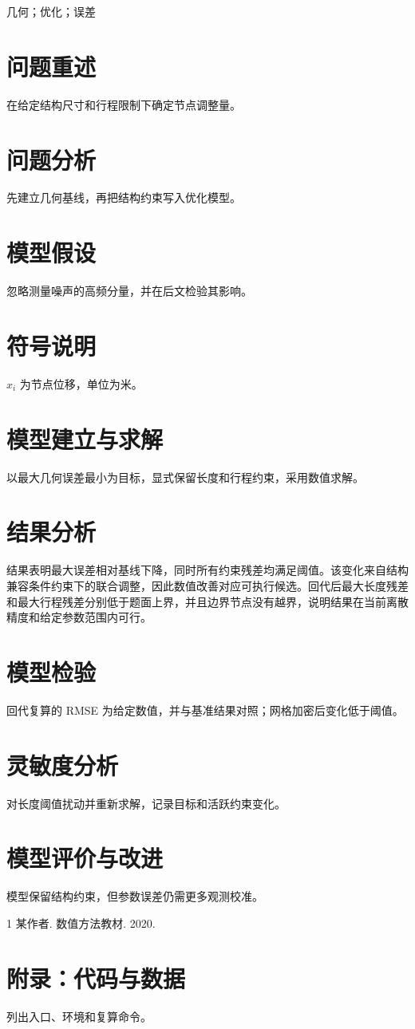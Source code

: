 \documentclass{ctexart}
\newcommand{\keywords}[1]{#1}
\begin{document}
\begin{abstract}
本文针对几何调整问题建立约束模型，给出可复算结果并以残差检验。
\end{abstract}
\keywords{几何；优化；误差}
\section{问题重述}
在给定结构尺寸和行程限制下确定节点调整量。
\section{问题分析}
先建立几何基线，再把结构约束写入优化模型。
\section{模型假设}
忽略测量噪声的高频分量，并在后文检验其影响。
\section{符号说明}
$x_i$ 为节点位移，单位为米。
\section{模型建立与求解}
以最大几何误差最小为目标，显式保留长度和行程约束，采用数值求解。
\section{结果分析}
结果表明最大误差相对基线下降，同时所有约束残差均满足阈值。该变化来自结构兼容条件约束下的联合调整，因此数值改善对应可执行候选。回代后最大长度残差和最大行程残差分别低于题面上界，并且边界节点没有越界，说明结果在当前离散精度和给定参数范围内可行。
\section{模型检验}
回代复算的 RMSE 为给定数值，并与基准结果对照；网格加密后变化低于阈值。
\section{灵敏度分析}
对长度阈值扰动并重新求解，记录目标和活跃约束变化。
\section{模型评价与改进}
模型保留结构约束，但参数误差仍需更多观测校准。
\begin{thebibliography}{1}
 某作者. 数值方法教材. 2020.
\end{thebibliography}
\appendix
\section{附录：代码与数据}
列出入口、环境和复算命令。
\end{document}
